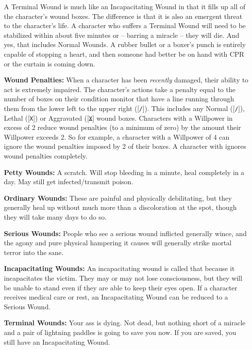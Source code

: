 A Terminal Wound is much like an Incapacitating Wound in that it fills up all of the character's wound boxes. The difference is that it is also an emergent threat to the character's life. A character who suffers a Terminal Wound will need to be stabilized within about five minutes or -- barring a miracle -- they will die. And yes, that includes Normal Wounds. A rubber bullet or a boxer's punch is entirely capable of stopping a heart, and then someone had better be on hand with CPR or the curtain is coming down.

\textbf{Wound Penalties:} When a character has been \textit{recently} damaged, their ability to act is extremely impaired. The character's actions take a penalty equal to the number of boxes on their condition monitor that have a line running through them from the lower left to the upper right ([\texttt{/}]). This includes any Normal ([\texttt{/}]), Lethal ([\texttt{X}]) or Aggravated ([\texttt{\sout{X}}] wound boxes. Characters with a Willpower in excess of 2 reduce wound penalties (to a minimum of zero) by the amount their Willpower exceeds 2. So for example, a character with a Willpower of 4 can ignore the wound penalties imposed by 2 of their boxes. A character with  ignores wound penalties completely.

\textbf{Petty Wounds:} A scratch. Will stop bleeding in a minute, heal completely in a day. May still get infected/transmit poison.

\textbf{Ordinary Wounds:} These are painful and physically debilitating, but they generally heal up without much more than a discoloration at the spot, though they will take many days to do so.

\textbf{Serious Wounds:} People who see a serious wound inflicted generally wince, and the agony and pure physical hampering it causes will generally strike mortal terror into the sane.

\textbf{Incapacitating Wounds:} An incapacitating wound is called that because it incapacitates the victim. They may or may not lose consciousness, but they will be unable to stand even if they are able to keep their eyes open. If a character receives medical care or rest, an Incapacitating Wound can be reduced to a Serious Wound.

\textbf{Terminal Wounds:} Your ass is dying. Not dead, but nothing short of a miracle and a pair of lightning paddles is going to save you now. If you are saved, you still have an Incapacitating Wound.

